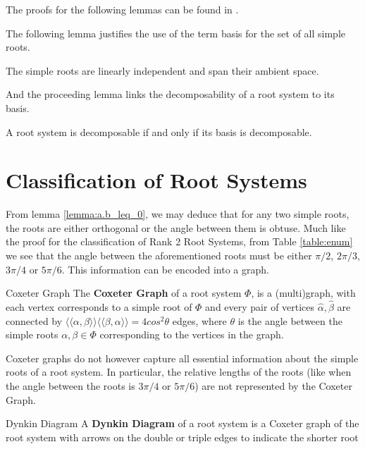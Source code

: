 The proofs for the following lemmas can be found in \cite{humphreys_1972_Weyl}.

The following lemma justifies the use of the term basis for the set of all simple roots.
\begin{lemma}
    \label{lemma:admit_config}
    The simple roots are linearly independent and span their ambient space.
\end{lemma}

And the proceeding lemma links the decomposability of a root system to its basis.
\begin{lemma}
    \label{lemma:decomp}
    A root system is decomposable if and only if its basis is decomposable.
\end{lemma}

\section{Classification of Root Systems}

From lemma \ref{lemma:a.b_leq_0}, we may deduce that for any two simple roots, the roots are either
orthogonal or the angle between them is obtuse. Much like the proof for the classification of Rank 2
Root Systems, from Table \ref{table:enum} we see that the angle between the aforementioned roots must
be either $\pi/2$, $2\pi/3$, $3\pi/4$ or $5\pi/6$. This information can be encoded into a graph. \newline

\begin{nameddefinition}{Coxeter Graph}
    The \textbf{Coxeter Graph} of a root system $\Phi$, is a (multi)graph, with each vertex
    corresponds to a simple root of $\Phi$ and every pair of vertices $\hat\alpha, \hat\beta$ are
    connected by $\langle \langle \alpha, \beta \rangle \rangle \langle \langle \beta, \alpha \rangle \rangle = 
    4cos^2\theta$ edges, where $\theta$ is the angle between the simple roots $\alpha, \beta \in \Phi$
    corresponding to the vertices in the graph.
\end{nameddefinition}

Coxeter graphs do not however capture all essential information about the simple roots of a root system.
In particular, the relative lengths of the roots (like when the angle between the roots is $3\pi/4$ or $5\pi/6$)
are not represented by the Coxeter Graph. \newline

\begin{nameddefinition}{Dynkin Diagram}
    A \textbf{Dynkin Diagram} of a root system is a Coxeter graph of the root system with arrows on
    the double or triple edges to indicate the shorter root
\end{nameddefinition}

